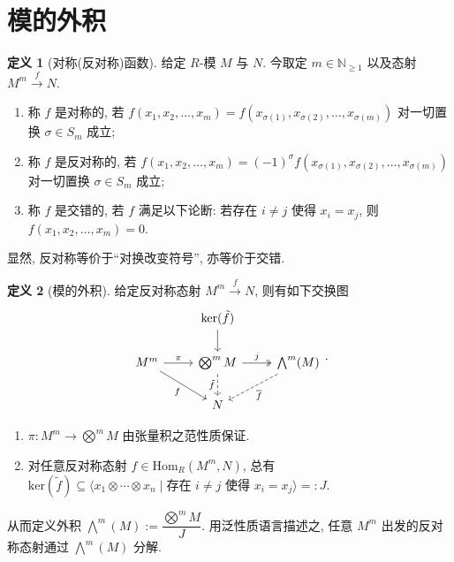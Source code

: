 \documentclass{MainStyle}
\theoremstyle{definition}
\theoremstyle{definition}
\theoremstyle{definition}
\newtheorem{definition}{定义}
\theoremstyle{definition}
\theoremstyle{definition}
\theoremstyle{definition}
\theoremstyle{definition}
\theoremstyle{remark}
\theoremstyle{remark}
\begin{document}
\maketitle
\tableofcontents

\section{模的外积}

\begin{definition}[对称(反对称)函数]
    给定 $R$-模 $M$ 与 $N$. 今取定 $m\in \mathbb N_{\geq 1}$ 以及态射 $M^m\overset f\longrightarrow N$.
    \begin{enumerate}
        \item 称 $f$ 是对称的, 若 $f(x_1,x_2,\ldots ,x_m)=f(x_{\sigma(1)},x_{\sigma(2)},\ldots, x_{\sigma (m)})$ 对一切置换 $\sigma\in S_m$ 成立;
        \item 称 $f$ 是反对称的, 若 $f(x_1,x_2,\ldots ,x_m)=(-1)^\sigma f(x_{\sigma(1)},x_{\sigma(2)},\ldots, x_{\sigma (m)})$ 对一切置换 $\sigma\in S_m$ 成立;
        \item 称 $f$ 是交错的, 若 $f$ 满足以下论断: 若存在 $i\neq j$ 使得 $x_i=x_j$, 则 $f(x_1,x_2,\ldots ,x_m)=0$.
    \end{enumerate}
    显然, 反对称等价于``对换改变符号'', 亦等价于交错.
\end{definition}

\begin{definition}[模的外积]
    给定反对称态射 $M^m\overset f\longrightarrow N$, 则有如下交换图
    \[\begin{tikzcd}
            & {\mathrm{ker}(\tilde f)} \\
            {M^m} & {\bigotimes ^mM} & {\bigwedge^m(M)} \\
            & N
            \arrow["\pi", from=2-1, to=2-2]
            \arrow["{\tilde f}"', dashed, from=2-2, to=3-2]
            \arrow["j", two heads, from=2-2, to=2-3]
            \arrow["{\overline f}", dashed, from=2-3, to=3-2]
            \arrow["f"', from=2-1, to=3-2]
            \arrow[from=1-2, to=2-2]
        \end{tikzcd}.\]
    \begin{enumerate}
        \item $\pi :M^m\to \bigotimes^m M$ 由张量积之范性质保证.
        \item 对任意反对称态射 $f\in \mathrm{Hom}_R(M^m,N)$, 总有 $\mathrm{ker}(\tilde f)\subseteq \langle x_1\otimes \cdots \otimes x_n\mid \text{存在 }i\neq j\text{ 使得 }x_i=x_j\rangle =:J$.
    \end{enumerate}
    从而定义外积 $\bigwedge ^m (M):=\dfrac{\bigotimes^m M}J$. 用泛性质语言描述之, 任意 $M^m$ 出发的反对称态射通过 $\bigwedge^m(M)$ 分解.
\end{definition}
\end{document}

